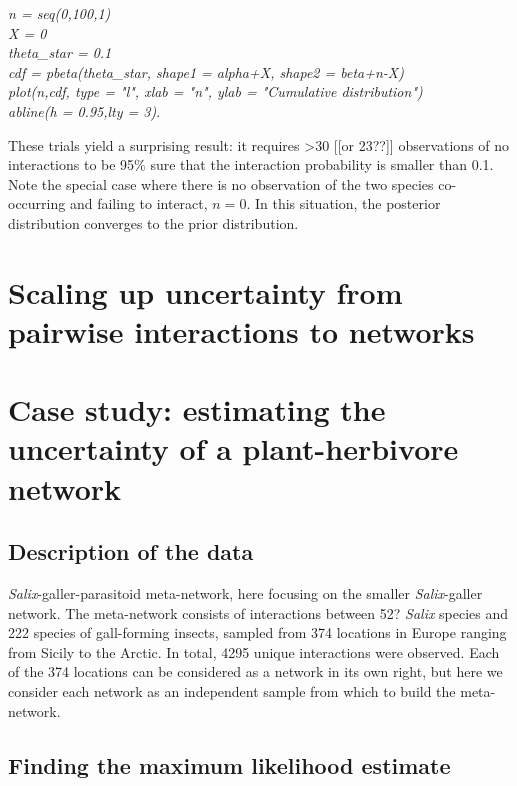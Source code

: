 \documentclass[12pt]{article}
\begin{document}
  \vspace{12pt}
\noindent\emph{
    \noindent n = seq(0,100,1)
    \\\noindent X = 0
    \\\noindent theta\_star = 0.1
    \\\noindent cdf = pbeta(theta\_star, shape1 = alpha+X, shape2 = beta+n-X)
    \\\noindent plot(n,cdf, type = "l", xlab = "n", ylab = "Cumulative distribution")
    \\\noindent abline(h = 0.95,lty = 3)}.
  \vspace{12pt}


These trials yield a surprising result: it requires \textgreater30 [[or 23??]] observations of no interactions to be 95\% sure that the interaction probability is smaller than 0.1. Note the special case where there is no observation of the two species co-occurring and failing to interact, $n = 0$. In this situation, the posterior distribution converges to the prior distribution. 



\section*{Scaling up uncertainty from pairwise interactions to networks}






\section*{Case study: estimating the uncertainty of a plant-herbivore network}

    \subsection*{Description of the data}

      \emph{Salix}-galler-parasitoid meta-network, here focusing on the smaller \emph{Salix}-galler network. The meta-network consists of interactions between 52? \emph{Salix} species and 222 species of gall-forming insects, sampled from 374 locations in Europe ranging from Sicily to the Arctic. In total, 4295 unique interactions were observed. Each of the 374 locations can be considered as a network in its own right, but here we consider each network as an independent sample from which to build the meta-network.


  \subsection*{Finding the maximum likelihood estimate}
\end{document}
